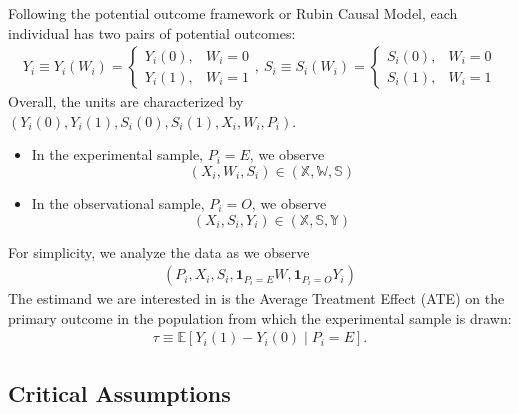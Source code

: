 Following the potential outcome framework or Rubin Causal Model, each individual has two pairs of potential outcomes:
\begin{equation}
    \begin{aligned}
        Y_i\equiv Y_i(W_i)=\left\{\begin{matrix}
            Y_i(0),& W_i=0\\
            Y_i(1),& W_i=1
        \end{matrix}\right.,\ S_i\equiv S_i(W_i)=\left\{\begin{matrix}
            S_i(0),& W_i=0\\
            S_i(1),& W_i=1
        \end{matrix}\right.
    \end{aligned}
    \nonumber
\end{equation}
Overall, the units are characterized by $(Y_i(0),Y_i(1),S_i(0),S_i(1),X_i,W_i,P_i)$.
\begin{itemize}
    \item In the experimental sample, $P_i=E$, we observe $$(X_i,W_i,S_i)\in (\mathbb{X},\mathbb{W},\mathbb{S})$$
    \item In the observational sample, $P_i=O$, we observe $$(X_i,S_i,Y_i)\in (\mathbb{X},\mathbb{S},\mathbb{Y})$$
\end{itemize}
For simplicity, we analyze the data as we observe
\begin{equation}
    \begin{aligned}
        (P_i,X_i,S_i,\mathbf{1}_{P_i=E}W,\mathbf{1}_{P_i=O}Y_i)
    \end{aligned}
    \nonumber
\end{equation}
The estimand we are interested in is  the Average Treatment Effect (ATE) on the primary outcome in the population from which the experimental sample is drawn:
\begin{equation}
    \begin{aligned}
        \tau\equiv \mathbb{E}[Y_i(1)-Y_i(0)\mid P_i=E].
    \end{aligned}
    \nonumber
\end{equation}

\subsection{Critical Assumptions}
